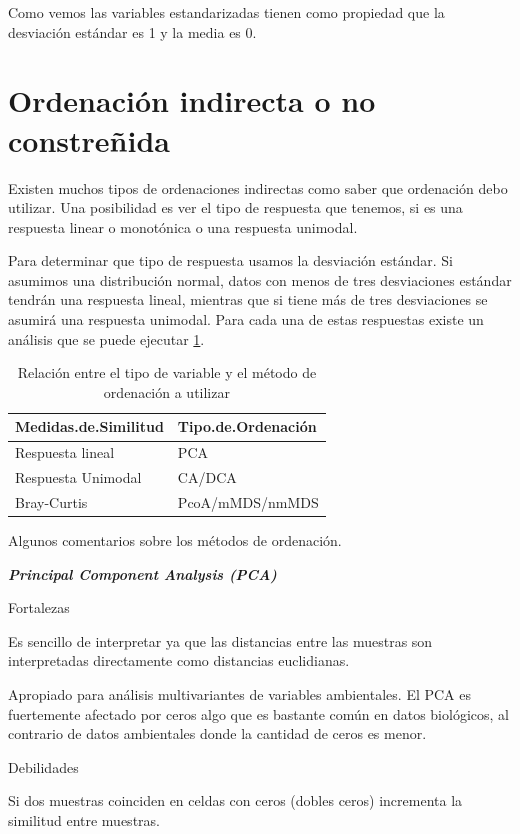\documentclass[]{book}
\begin{document}
Como vemos las variables estandarizadas tienen como propiedad que la
desviación estándar es 1 y la media es 0.

\section{Ordenación indirecta o no
constreñida}\label{ordenacion-indirecta-o-no-constrenida}

Existen muchos tipos de ordenaciones indirectas como saber que
ordenación debo utilizar. Una posibilidad es ver el tipo de respuesta
que tenemos, si es una respuesta linear o monotónica o una respuesta
unimodal.

Para determinar que tipo de respuesta usamos la desviación estándar. Si
asumimos una distribución normal, datos con menos de tres desviaciones
estándar tendrán una respuesta lineal, mientras que si tiene más de tres
desviaciones se asumirá una respuesta unimodal. Para cada una de estas
respuestas existe un análisis que se puede ejecutar
\ref{tab:ordenacion}.

\begin{table}

\caption{\label{tab:ordenacion}Relación entre el tipo de variable y el método de ordenación a utilizar}
\centering
\begin{tabular}[t]{ll}
\toprule
Medidas.de.Similitud & Tipo.de.Ordenación\\
\midrule
Respuesta lineal & PCA\\
Respuesta Unimodal & CA/DCA\\
Bray-Curtis & PcoA/mMDS/nmMDS\\
\bottomrule
\end{tabular}
\end{table}

Algunos comentarios sobre los métodos de ordenación.

\textbf{\emph{Principal Component Analysis (PCA)}}

Fortalezas

Es sencillo de interpretar ya que las distancias entre las muestras son
interpretadas directamente como distancias euclidianas.

Apropiado para análisis multivariantes de variables ambientales. El PCA
es fuertemente afectado por ceros algo que es bastante común en datos
biológicos, al contrario de datos ambientales donde la cantidad de ceros
es menor.

Debilidades

Si dos muestras coinciden en celdas con ceros (dobles ceros) incrementa
la similitud entre muestras.
\end{document}
